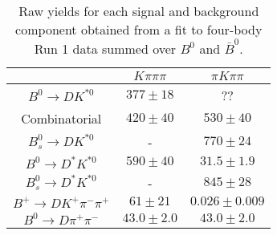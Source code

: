 \begin{table}
  \centering
  \begin{tabular}{ccc}
      \toprule
       & $K\pi\pi\pi$ & $\pi K\pi\pi$ \\
      \midrule
      $B^0 \to DK^{*0}$ & $377 \pm 18$ & ?? \\
      Combinatorial & $420 \pm 40$ & $530 \pm 40$ \\
      $B^0_s \to DK^{*0}$ & \-- & $770 \pm 24$ \\
      $B^0 \to D^*K^{*0}$ & $590 \pm 40$ & $31.5 \pm 1.9$ \\
      $B^0_s \to D^*K^{*0}$ & \-- & $845 \pm 28$ \\
      $B^+ \to DK^+\pi^-\pi^+$ & $61 \pm 21$ & $0.026 \pm 0.009$ \\
      $B^0 \to D\pi^+\pi^-$ & $43.0 \pm 2.0$ & $43.0 \pm 2.0$ \\
      \bottomrule
      \end{tabular}
  \caption{Raw yields for each signal and background component obtained from a fit to four-body Run 1 data summed over $B^0$ and $\bar{B}^0$.}
\label{tab:yields_combined_4body_run1}
\end{table}
